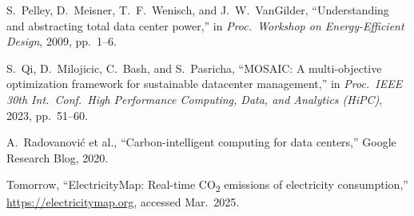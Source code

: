 \documentclass[12pt]{article}
\begin{document}
\begin{thebibliography}{}
 S.~Pelley, D.~Meisner, T.~F.~Wenisch, and J.~W.~VanGilder, ``Understanding and abstracting total data center power,'' in \textit{Proc.\ Workshop on Energy-Efficient Design}, 2009, pp.\ 1--6.

 S.~Qi, D.~Milojicic, C.~Bash, and S.~Pasricha, ``MOSAIC: A multi-objective optimization framework for sustainable datacenter management,'' in \textit{Proc.\ IEEE 30th Int.\ Conf.\ High Performance Computing, Data, and Analytics (HiPC)}, 2023, pp.\ 51--60.

 A.~Radovanovi\'{c} et al., ``Carbon-intelligent computing for data centers,'' Google Research Blog, 2020.

 Tomorrow, ``ElectricityMap: Real-time CO\textsubscript{2} emissions of electricity consumption,'' \url{https://electricitymap.org}, accessed Mar.\ 2025.

\end{thebibliography}
\end{document}
